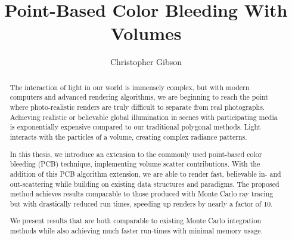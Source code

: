 \documentclass[12pt]{ucthesis}
\begin{document}

\title{Point-Based Color Bleeding With Volumes}
\author{Christopher Gibson}
  
 
     



\maketitle

\begin{frontmatter}

\copyrightpage

\committeemembershippage

\begin{abstract}

The interaction of light in our world is immensely complex, but with modern computers and advanced rendering algorithms, we are beginning to reach the point where photo-realistic renders are truly difficult to separate from real photographs.  Achieving realistic or believable global illumination in scenes with participating media is exponentially expensive compared to our traditional polygonal methods.  Light interacts with the particles of a volume, creating complex radiance patterns.

In this thesis, we introduce an extension to the commonly used point-based color bleeding (PCB) technique, implementing volume scatter contributions.  With the addition of this PCB algorithm extension, we are able to render fast, believable in- and out-scattering while building on existing data structures and paradigms.  The proposed method achieves results comparable to those produced with Monte Carlo ray tracing but with drastically reduced run times, speeding up renders by nearly a factor of 10.

We present results that are both comparable to existing Monte Carlo integration methods while also achieving much faster run-times with minimal memory usage.

\end{abstract}





\tableofcontents


\listoftables

\listoffigures

\end{frontmatter}
\end{document}
